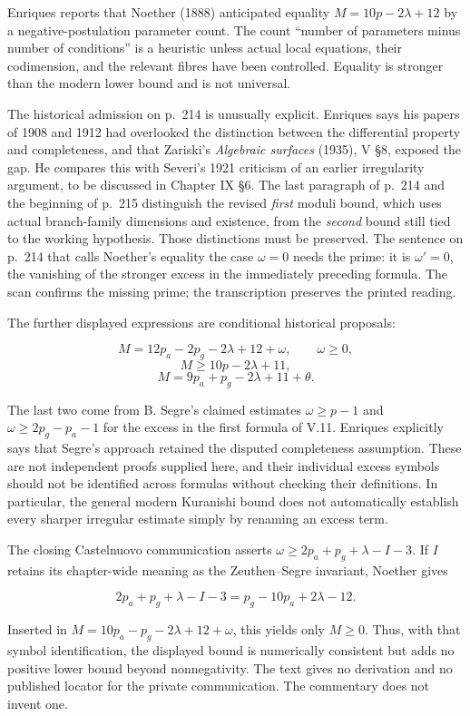 Enriques reports that Noether (1888) anticipated equality \(M=10p-2\lambda+12\) by a negative-postulation parameter count. The count ``number of parameters minus number of conditions'' is a heuristic unless actual local equations, their codimension, and the relevant fibres have been controlled. Equality is stronger than the modern lower bound and is not universal.

The historical admission on p.~214 is unusually explicit. Enriques says his papers of 1908 and 1912 had overlooked the distinction between the differential property and completeness, and that Zariski's \emph{Algebraic surfaces} (1935), V §8, exposed the gap. He compares this with Severi's 1921 criticism of an earlier irregularity argument, to be discussed in Chapter IX §6. The last paragraph of p.~214 and the beginning of p.~215 distinguish the revised \emph{first} moduli bound, which uses actual branch-family dimensions and existence, from the \emph{second} bound still tied to the working hypothesis. Those distinctions must be preserved. The sentence on p.~214 that calls Noether's equality the case \(\omega=0\) needs the prime: it is \(\omega'=0\), the vanishing of the stronger excess in the immediately preceding formula. The scan confirms the missing prime; the transcription preserves the printed reading.

The further displayed expressions are conditional historical proposals:

\[
M=12p_a-2p_g-2\lambda+12+\omega,\qquad \omega\ge0,
\] \[
M\ge10p-2\lambda+11,
\] \[
M=9p_a+p_g-2\lambda+11+\theta.
\]

The last two come from B. Segre's claimed estimates \(\omega\ge p-1\) and \(\omega\ge2p_g-p_a-1\) for the excess in the first formula of V.11. Enriques explicitly says that Segre's approach retained the disputed completeness assumption. These are not independent proofs supplied here, and their individual excess symbols should not be identified across formulas without checking their definitions. In particular, the general modern Kuranishi bound does not automatically establish every sharper irregular estimate simply by renaming an excess term.

The closing Castelnuovo communication asserts \(\omega\ge2p_a+p_g+\lambda-I-3\). If \(I\) retains its chapter-wide meaning as the Zeuthen--Segre invariant, Noether gives

\[
2p_a+p_g+\lambda-I-3=p_g-10p_a+2\lambda-12.
\]

Inserted in \(M=10p_a-p_g-2\lambda+12+\omega\), this yields only \(M\ge0\). Thus, with that symbol identification, the displayed bound is numerically consistent but adds no positive lower bound beyond nonnegativity. The text gives no derivation and no published locator for the private communication. The commentary does not invent one.

